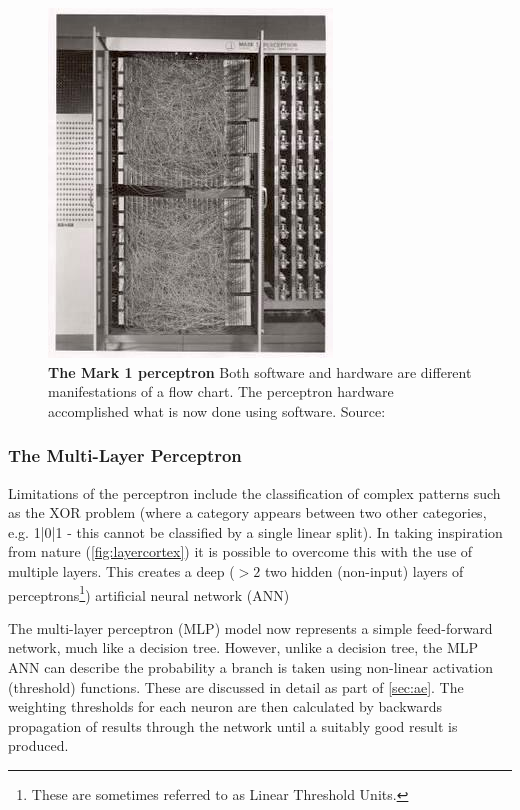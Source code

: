 \begin{figure}[H]
     \centering
         \includegraphics[width=.45\textwidth]{figures_c3/mlpregressor/Mark_I_perceptron.jpg}
        \caption{\textbf{The Mark 1 perceptron} Both software and hardware are different manifestations of a flow chart. The perceptron hardware accomplished what is now done using software. Source: \cite{perceptronimage}}
        \label{fig:perceptron}
\end{figure}

\subsubsection{The Multi-Layer Perceptron}\label{sec:perceptron}
Limitations of the perceptron include the classification of complex patterns such as the XOR problem (where a category appears between two other categories, e.g. {1|0|1} - this cannot be classified by a single linear split). In taking inspiration from nature (\autoref{fig:layercortex}) it is possible to overcome this with the use of multiple layers. This creates a deep ($>2$ two hidden (non-input) layers of perceptrons\footnote{These are sometimes referred to as Linear Threshold Units.}) artificial neural network (ANN)

The multi-layer perceptron (MLP) model now represents a simple feed-forward network, much like a decision tree. However, unlike a decision tree, the MLP ANN can describe the probability a branch is taken using non-linear activation (threshold) functions. These are discussed in detail as part of \autoref{sec:ae}. The weighting thresholds for each neuron are then calculated by backwards propagation of results through the network until a suitably good result is produced.

